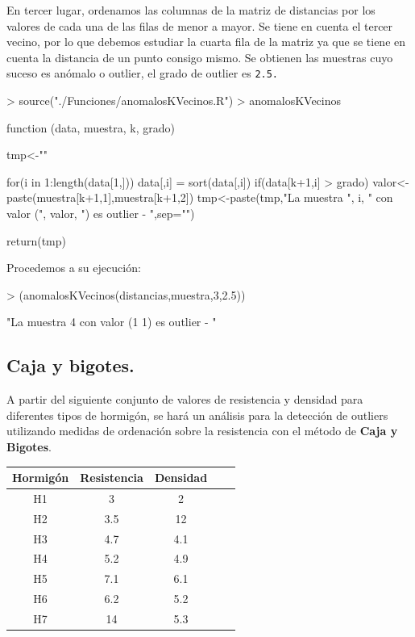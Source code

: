 \documentclass [a4paper] {article}
\begin{document}
\bigskip
En tercer lugar, ordenamos las columnas de la matriz de distancias por los valores de cada una de
las filas de menor a mayor. Se tiene en cuenta el tercer vecino, por lo que debemos estudiar la cuarta 
fila de la matriz ya que se tiene en cuenta la distancia de un punto consigo mismo. Se obtienen las 
muestras cuyo suceso es anómalo o outlier, el grado de outlier es \texttt{2.5.}
\begin{Schunk}
\begin{Sinput}
> source("./Funciones/anomalosKVecinos.R")
> anomalosKVecinos
\end{Sinput}
\begin{Soutput}
function (data, muestra, k, grado) {
    tmp<-""

    for(i in 1:length(data[1,])){
        data[,i] = sort(data[,i])
        if(data[k+1,i] > grado) {
            valor<-paste(muestra[k+1,1],muestra[k+1,2])
            tmp<-paste(tmp,"La muestra ", i, " con valor (", valor, ") es outlier - ",sep="")
        }
    }

    return(tmp)
}
\end{Soutput}
\end{Schunk}

\bigskip
Procedemos a su ejecución:
\begin{Schunk}
\begin{Sinput}
> (anomalosKVecinos(distancias,muestra,3,2.5))
\end{Sinput}
\begin{Soutput}
[1] "La muestra 4 con valor (1 1) es outlier - "
\end{Soutput}
\end{Schunk}

\subsection{Caja y bigotes.}
\bigskip
A partir del siguiente conjunto de valores de resistencia y densidad para diferentes tipos de hormigón,
se hará un análisis para la detección de outliers utilizando medidas de ordenación sobre la resistencia
con el método de \textbf{Caja y Bigotes}.

\begin{table}[H]
\begin{center}
\begin{tabular}{|c|c|c|c|c|}
\hline
Hormigón & Resistencia & Densidad\\
\hline \hline
H1 & 3 & 2 \\ \hline
H2 & 3.5 & 12 \\ \hline
H3 & 4.7 & 4.1 \\ \hline
H4 & 5.2 & 4.9 \\ \hline
H5 & 7.1 & 6.1 \\ \hline
H6 & 6.2 & 5.2 \\ \hline
H7 & 14 & 5.3 \\ \hline
\end{tabular}
\end{center}
\end{table}
\end{document}
